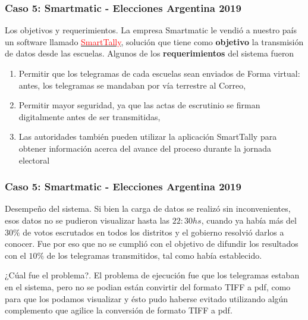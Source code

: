 \documentclass[11pt]{beamer}
\begin{document}
    \begin{frame}
    	\frametitle{Caso 5: Smartmatic - Elecciones Argentina 2019}
    	\begin{block}{Los objetivos y requerimientos.}
    		La empresa Smartmatic le vendió a nuestro país un software llamado \href{https://www.smartmatic.com/es/elecciones/elecciones-manuales/smarttally/}{\textcolor{red}{SmartTally}}, solución que tiene como \textbf{objetivo} la transmisión de datos desde las escuelas. Algunos de los \textbf{requerimientos} del sistema fueron
    		\pause
    		\begin{enumerate}
    			\item Permitir que los telegramas de cada escuelas sean enviados de Forma virtual: antes, los telegramas se mandaban por vía terrestre al Correo,
    			\pause
    			\item Permitir mayor seguridad, ya que las actas de escrutinio se firman digitalmente antes de ser transmitidas,
    			\pause
    			\item Las autoridades también pueden utilizar la aplicación SmartTally para obtener información acerca del avance del proceso durante la jornada electoral
    		\end{enumerate}
    	\end{block}	
    \end{frame}

    \begin{frame}
    	\frametitle{Caso 5: Smartmatic - Elecciones Argentina 2019}
    	\begin{block}{Desempeño del sistema.}
    		 Si bien la carga de datos se realizó sin inconvenientes, esos datos no se pudieron visualizar hasta las $22:30hs$, cuando ya había más del $30\%$ de votos escrutados en todos los distritos y el gobierno resolvió darlos a conocer. Fue por eso que no se cumplió con el objetivo de difundir los resultados con el $10\%$ de los telegramas transmitidos, tal como había establecido.
    	\end{block}
        \pause
        \begin{block}{¿Cúal fue el problema?.}
        	El problema de ejecución fue que los telegramas estaban en el sistema, pero no se podian están convirtir del formato TIFF a pdf, como para que los podamos visualizar y ésto pudo haberse evitado utilizando algún complemento que agilice la conversión de formato TIFF a pdf.
        \end{block}
    \end{frame}
 
\end{document}
